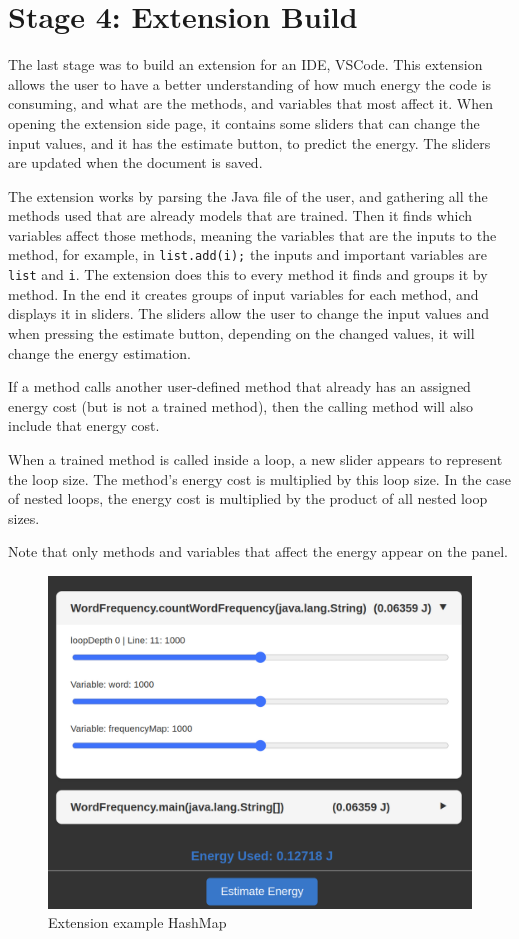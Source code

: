 \section{Stage 4: Extension Build} \label{sec:work_stage4_extension_build}

The last stage was to build an extension for an IDE, VSCode. This extension allows the user to have a better understanding of how much energy the code is consuming, and what are the methods, and variables that most affect it.
When opening the extension side page, it contains some sliders that can change the input values, and it has the estimate button, to predict the energy.
The sliders are updated when the document is saved.%

The extension works by parsing the Java file of the user, and gathering all the methods used that are already models that are trained. Then it finds which variables affect those methods, meaning the variables that are the inputs to the method, for example, in \texttt{list.add(i);}  the inputs and important variables are \texttt{list} and \texttt{i}.
The extension does this to every method it finds and groups it by method. In the end it creates groups of input variables for each method, and displays it in sliders. The sliders allow the user to change the input values and when pressing the estimate button, depending on the changed values, it will change the energy estimation.

If a method calls another user-defined method that already has an assigned energy cost (but is not a trained method), then the calling method will also include that energy cost.

When a trained method is called inside a loop, a new slider appears to represent the loop size. The method’s energy cost is multiplied by this loop size. In the case of nested loops, the energy cost is multiplied by the product of all nested loop sizes.

Note that only methods and variables that affect the energy appear on the panel.

\begin{figure}[htbp]
  \centering
  \includegraphics[width = .8 \textwidth]{figures/extension_example1.png}
  \caption{Extension example HashMap}
  \label{fig:extension_example1}
\end{figure}

